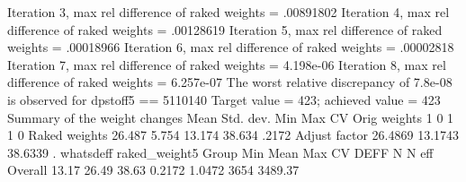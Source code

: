  Iteration 3, max rel difference of raked weights = .00891802
 Iteration 4, max rel difference of raked weights = .00128619
 Iteration 5, max rel difference of raked weights = .00018966
 Iteration 6, max rel difference of raked weights = .00002818
 Iteration 7, max rel difference of raked weights = 4.198e-06
 Iteration 8, max rel difference of raked weights = 6.257e-07
The worst relative discrepancy of  7.8e-08 is observed for dpstoff5 == 5110140
Target value =        423; achieved value =        423
{\smallskip}
   Summary of the weight changes
{\smallskip}
              {\VBAR}    Mean    Std. dev.    Min        Max       CV
Orig weights  {\VBAR}        1          0         1           1       0
Raked weights {\VBAR}   26.487      5.754    13.174      38.634   .2172
Adjust factor {\VBAR}  26.4869              13.1743     38.6339
{\smallskip}
. whatsdeff raked_weight5
{\smallskip}
  Group   {\VBAR}   Min     {\VBAR}   Mean    {\VBAR}   Max     {\VBAR}    CV   {\VBAR}   DEFF  {\VBAR}   N   {\VBAR}  N eff
  Overall {\VBAR}     13.17 {\VBAR}     26.49 {\VBAR}     38.63 {\VBAR}  0.2172 {\VBAR}  1.0472 {\VBAR}  3654 {\VBAR} 3489.37
{\smallskip}
